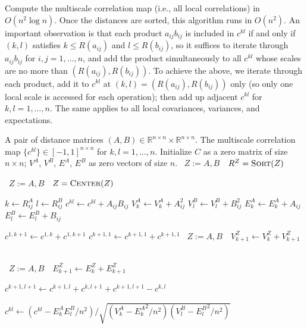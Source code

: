 \documentclass[11pt]{article}
\newcommand{\Real}{\mathbb{R}}
\newcommand{\GG}{c}
\newcommand{\Linefor}[2]{%
    \State \algorithmicfor\ {#1}\ \algorithmicdo\ {#2} \algorithmicend\ \algorithmicfor%
}
\newcommand{\rto}{\leftarrow}
\begin{document}
\begin{algorithm}
\caption{Compute the multiscale correlation map (i.e., all local correlations) in $O(n^2 \log n)$. Once the distances are sorted, this algorithm runs in $O(n^2)$. An important observation is that each product $a_{ij}b_{ij}$ is included in $\GG^{kl}$ if and only if $(k,l)$ satisfies $k\leq R(a_{ij})$ and $l\leq R(b_{ij})$, so it suffices to iterate through $a_{ij}b_{ij}$ for $i,j=1,\ldots,n$, and add the product simultaneously to all $\GG^{kl}$ whose scales are no more than $(R(a_{ij}),R(b_{ij}))$. To achieve the above, we iterate through each product, add it to $\GG^{kl}$ at $(k,l)=(R(a_{ij}),R(b_{ij}))$ only (so only one local scale is accessed for each operation); then add up adjacent $\GG^{kl}$ for $k,l=1,\ldots,n$. The same applies to all local covariances, variances, and expectations.} 
\label{alg:all_scales}
\begin{algorithmic}[1]
\Require A pair of distance matrices $(A, B) \in \Real^{n \times n} \times \Real^{n \times n}$.
\Ensure The multiscale correlation map $\{\GG^{kl}\} \in [-1,1]^{n \times n}$ for $k,l=1,\ldots,n$.
\State Initialize $C$ as a zero matrix of size $n \times n$; $V^{A}$, $V^{B}$, $E^{A}$, $E^{B}$ as zero vectors of size $n$.
\Linefor{$Z:=A,B$}{$R^{Z}=\textsc{Sort}(Z)$}
\Linefor{$Z:=A,B$}{$Z=\textsc{Center}(Z)$}

  
\State $k \rto R^{A}_{ij}$
\State $l \rto R^{B}_{ij}$
\State $\GG^{kl} \rto \GG^{kl}+A_{ij}B_{ij}$
\State $V^{A}_{k} \rto V^{A}_{k}+A_{ij}^2$
\State $V^{B}_{l} \rto V^{B}_{l}+B_{ij}^2$
\State $E^{A}_{k} \rto E^{A}_{k}+A_{ij}$
\State $E^{B}_{l} \rto E^{B}_{l}+B_{ij}$
\EndFor

  
\State $\GG^{1, k+1} \rto \GG^{1, k}+\GG^{1, k+1}$
\State $\GG^{k+1,1} \rto \GG^{k+1,1}+\GG^{k+1,1}$
\Linefor{$Z:=A,B$}{$V^{Z}_{k+1} \rto V^{Z}_{k}+V^{Z}_{k+1}$}
\Linefor{$Z:=A,B$}{$E^{Z}_{k+1} \rto E^{Z}_{k}+E^{Z}_{k+1}$}
\EndFor

\State $\GG^{k+1,l+1} \rto \GG^{k+1,l}+\GG^{k,l+1}+\GG^{k+1,l+1}-\GG^{k,l}$
\EndFor

\State $\GG^{kl} \rto \left(\GG^{kl}-E^{A}_{k}E^{B}_{l}/n^2\right)/\sqrt{\left(V^{A}_{k}-{E^{A}_{k}}^2/n^2\right) \left(V^{B}_{l}-{E^{B}_{l}}^2/n^2\right)}$
\EndFor
\EndFunction
\end{algorithmic}
\end{algorithm}
\end{document}
